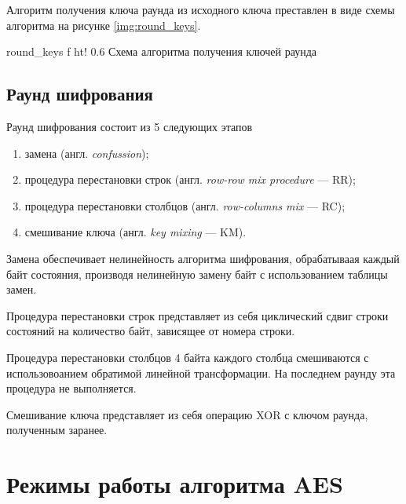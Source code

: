 \clearpage

Алгоритм получения ключа раунда из исходного ключа преставлен в виде схемы алгоритма на рисунке \ref{img:round_keys}.

{round_keys} %
{f} %
{ht!} %
{0.6\textwidth} %
{Схема алгоритма получения ключей раунда} %


\subsection{Раунд шифрования}

Раунд шифрования состоит из 5 следующих этапов
\begin{enumerate}[label=\arabic*)]
	\item замена (англ. \textit{confussion});
	\item процедура перестановки строк (англ. \textit{row-row mix procedure} --- RR);
	\item процедура перестановки столбцов (англ. \textit{row-columns mix} --- RC);
	\item смешивание ключа (англ. \textit{key mixing} --- KM).
\end{enumerate}

Замена обеспечивает нелинейность алгоритма шифрования, обрабатываая каждый байт состояния, производя нелинейную замену байт с использованием таблицы замен.

Процедура перестановки строк представляет из себя циклический сдвиг строки состояний на количество байт, зависящее от номера строки.

Процедура перестановки столбцов 4 байта каждого столбца смешиваются с использовоанием обратимой линейной трансформации. На последнем раунду эта процедура не выполняется.

Смешивание ключа представляет из себя операцию XOR с ключом раунда, полученным заранее.

\section{Режимы работы алгоритма AES}

